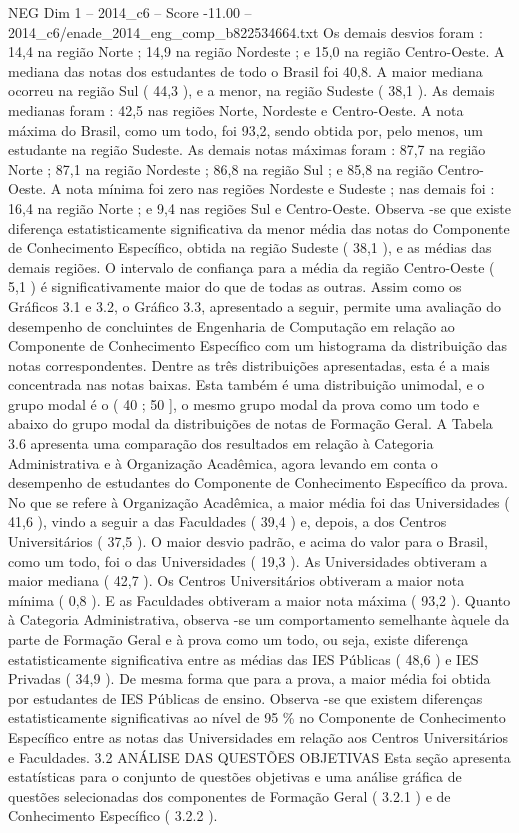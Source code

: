\begin{textsample}{NEG Dim 1 – 2014\_c6 – Score -11.00 – 2014\_c6/enade\_2014\_eng\_comp\_b822534664.txt}
Os demais desvios foram : 14,4 na região Norte ; 14,9 na região Nordeste ; e 15,0 na região Centro-Oeste.
A mediana das notas dos estudantes de todo o Brasil foi 40,8.
A maior mediana ocorreu na região Sul ( 44,3 ), e a menor, na região Sudeste ( 38,1 ).
As demais medianas foram : 42,5 nas regiões Norte, Nordeste e Centro-Oeste.
A nota máxima do Brasil, como um todo, foi 93,2, sendo obtida por, pelo menos, um estudante na região Sudeste.
As demais notas máximas foram : 87,7 na região Norte ; 87,1 na região Nordeste ; 86,8 na região Sul ; e 85,8 na região Centro-Oeste.
A nota mínima foi zero nas regiões Nordeste e Sudeste ; nas demais foi : 16,4 na região Norte ; e 9,4 nas regiões Sul e Centro-Oeste.
Observa -se que existe diferença estatisticamente significativa da menor média das notas do Componente de Conhecimento Específico, obtida na região Sudeste ( 38,1 ), e as médias das demais regiões.
O intervalo de confiança para a média da região Centro-Oeste ( 5,1 ) é significativamente maior do que de todas as outras.
Assim como os Gráficos 3.1 e 3.2, o Gráfico 3.3, apresentado a seguir, permite uma avaliação do desempenho de concluintes de Engenharia de Computação em relação ao Componente de Conhecimento Específico com um histograma da distribuição das notas correspondentes.
Dentre as três distribuições apresentadas, esta é a mais concentrada nas notas baixas.
Esta também é uma distribuição unimodal, e o grupo modal é o ( 40 ; 50 ], o mesmo grupo modal da prova como um todo e abaixo do grupo modal da distribuições de notas de Formação Geral.
A Tabela 3.6 apresenta uma comparação dos resultados em relação à Categoria Administrativa e à Organização Acadêmica, agora levando em conta o desempenho de estudantes do Componente de Conhecimento Específico da prova.
No que se refere à Organização Acadêmica, a maior média foi das Universidades ( 41,6 ), vindo a seguir a das Faculdades ( 39,4 ) e, depois, a dos Centros Universitários ( 37,5 ).
O maior desvio padrão, e acima do valor para o Brasil, como um todo, foi o das Universidades ( 19,3 ).
As Universidades obtiveram a maior mediana ( 42,7 ).
Os Centros Universitários obtiveram a maior nota mínima ( 0,8 ).
E as Faculdades obtiveram a maior nota máxima ( 93,2 ).
Quanto à Categoria Administrativa, observa -se um comportamento semelhante àquele da parte de Formação Geral e à prova como um todo, ou seja, existe diferença estatisticamente significativa entre as médias das IES Públicas ( 48,6 ) e IES Privadas ( 34,9 ).
De mesma forma que para a prova, a maior média foi obtida por estudantes de IES Públicas de ensino.
Observa -se que existem diferenças estatisticamente significativas ao nível de 95 \% no Componente de Conhecimento Específico entre as notas das Universidades em relação aos Centros Universitários e Faculdades. 3.2 ANÁLISE DAS QUESTÕES OBJETIVAS Esta seção apresenta estatísticas para o conjunto de questões objetivas e uma análise gráfica de questões selecionadas dos componentes de Formação Geral ( 3.2.1 ) e de Conhecimento Específico ( 3.2.2 ).

\end{textsample}
